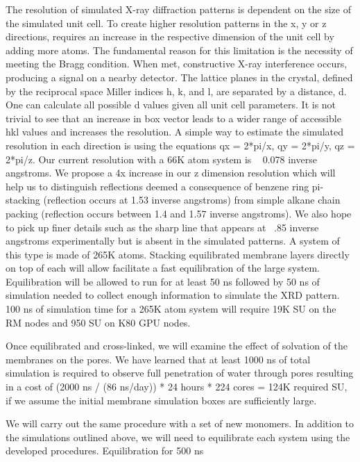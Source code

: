 The resolution of simulated X-ray diffraction patterns is dependent on the
size of the simulated unit cell. To create higher resolution patterns in 
the x, y or z directions, requires an increase in the respective dimension
of the unit cell by adding more atoms. The fundamental reason for this
limitation is the necessity of meeting the Bragg condition. When met,
constructive X-ray interference occurs, producing a signal on a nearby 
detector. The lattice planes in the crystal, defined by the reciprocal
space Miller indices h, k, and l, are separated by a distance, d. One can
calculate all possible d values given all unit cell parameters. It is
not trivial to see that an increase in box vector leads to a wider range
of accessible hkl values and increases the resolution. A simple way to 
estimate the simulated resolution in each direction is using the equations
qx = 2*pi/x, qy = 2*pi/y, qz = 2*pi/z. Our current resolution with a 66K
atom system is ~ 0.078 inverse angstroms. We propose a 4x increase in our
z dimension resolution which will help us to distinguish reflections 
deemed a consequence of benzene ring pi-stacking (reflection occurs at 1.53
inverse angstroms) from simple alkane chain packing (reflection occurs
between 1.4 and 1.57 inverse angstroms). We also hope to pick up finer 
details such as the sharp line that appears at ~.85 inverse angstroms 
experimentally but is absent in the simulated patterns. A system of this 
type is made of 265K atoms. Stacking equilibrated membrane layers 
directly on top of each will allow facilitate a fast equilibration of the
large system. Equilibration will be allowed to run for at least 50 ns 
followed by 50 ns of simulation needed to collect enough information to
simulate the XRD pattern. 100 ns of simulation time for a 265K atom system 
will require 19K SU on the RM nodes and 950 SU on K80 GPU nodes.     


Once equilibrated and cross-linked, we will examine the effect of
solvation of the membranes on the pores. We have learned that at least 
1000 ns of total simulation is required to observe full penetration of
water through pores resulting in a cost of 
(2000 ns / (86 ns/day)) * 24
hours * 224 cores = 124K required SU, if we assume the initial
membrane simulation boxes are sufficiently large.

We will carry out the same procedure with a set of new monomers. In addition to the simulations outlined above, we will need to equilibrate each system
using the developed procedures. Equilibration for 500 ns  

